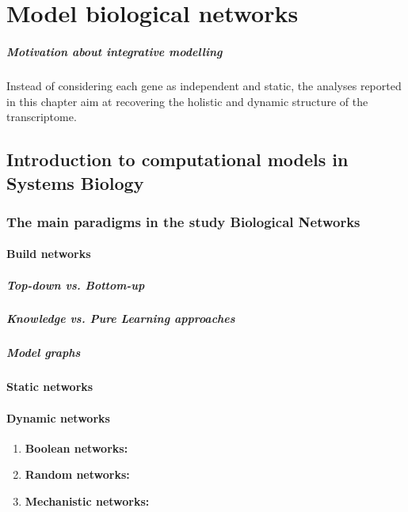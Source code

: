 \chapter{Model biological networks}

\paragraph{Motivation about integrative modelling}
Instead of considering each gene as independent and static, the analyses reported in this chapter aim at recovering the holistic and dynamic structure of the transcriptome.

\section{Introduction to computational models in Systems Biology}

\subsection{The main paradigms in the study Biological Networks}

\subsubsection{Build networks}
\paragraph{Top-down vs. Bottom-up}
\paragraph{Knowledge vs. Pure Learning approaches}
\paragraph{Model graphs}

\subsubsection{Static networks}

\subsubsection{Dynamic networks}

\begin{enumerate}[label=\alph*)]
\item \textbf{Boolean networks:}
\item \textbf{Random networks:}
\item \textbf{Mechanistic networks:}

\end{enumerate}



